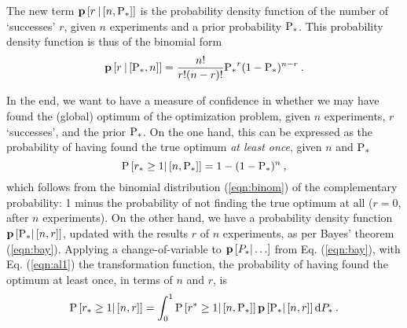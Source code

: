 \documentclass[11pt]{article}
\begin{document}
The new term $\p\left[ r \: | \left[ n, \P_\ast \right]  \right]$ is the probability density function of the number of `successes' $r$, given $n$ experiments and a prior probability $\P_\ast$. This probability density function is thus of the binomial form
\begin{equation}
\label{eqn:binom}
\p\left[ r \: | \left[ \P_\ast , n \right] \right] = \frac{n!}{r! (n - r)!} {\P_\ast}^r ( 1 - \P_\ast)^{n - r} \: .
\end{equation}

In the end, we want to have a measure of confidence in whether we may have found the (global) optimum of the optimization problem, given $n$ experiments, $r$ `successes', and the prior $\P_\ast$. On the one hand, this can be expressed as the probability of having found the true optimum \emph{at least once}, given $n$ and $\P_\ast$ 
\begin{equation}
\label{eqn:al1}
\P \left[ r_\ast \ge 1 | \left[ n, \P_\ast \right] \right] = 1- (1 - \P_\ast)^n \:,
\end{equation}
which follows from the binomial distribution (\ref{eqn:binom}) of the complementary probability: 1 minus the probability of not finding the true optimum at all ($r=0$, after $n$ experiments). On the other hand, we have a probability density function $\p\left[\P_\ast | \left[ n, r \right] \right]$, updated with the results $r$ of $n$ experiments, as per Bayes' theorem (\ref{eqn:bay}). Applying a change-of-variable \cite{dekking2005} to $\p\left[P_\ast | \ldots\right]$ from Eq. (\ref{eqn:bay}), with Eq. (\ref{eqn:al1}) the transformation function, the probability of having found the optimum at least once, in terms of $n$ and $r$, is
\begin{equation}
\label{eqn:al2}
\P \left[ r_\ast \ge 1 | \left[ n, r \right] \right] = \int^1_0 \P \left[ r^\ast \ge 1 | \left[ n, \P_\ast \right] \right] \p\left[\P_\ast | \left[ n, r \right] \right] \textrm{d}P_\ast \:.
\end{equation}
\end{document}

